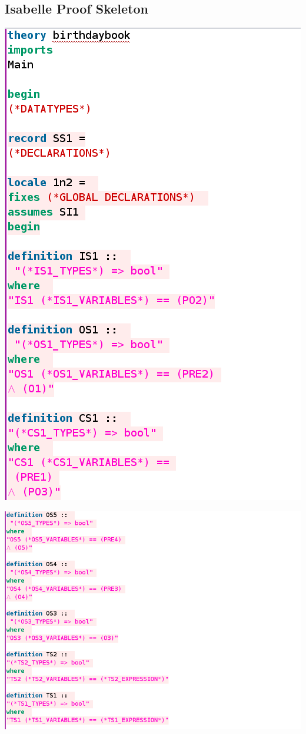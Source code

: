 \subsection{Isabelle Proof Skeleton}
\label{app:bb4}
\includegraphics[scale=0.5]{examples/bb/4imagea.png}

\noindent \includegraphics[scale=0.5]{examples/bb/4imageb.png}


